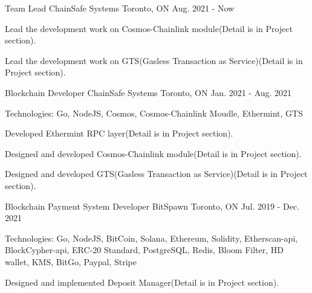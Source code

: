 \vspace{-2.0em}
\begin{cventries}
    \cventry
    {Team Lead}
    {ChainSafe Systems}
    {Toronto, ON}
    {Aug. 2021 - Now}
    {
      \begin{cvitems}
        \item {Lead the development work on Cosmos-Chainlink module(Detail is in Project section).}
        \item {Lead the development work on GTS(Gasless Transaction as Service)(Detail is in Project section).}
      \end{cvitems}
    }
    
    \cventry
    {Blockchain Developer}
    {ChainSafe Systems}
    {Toronto, ON}
    {Jan. 2021 - Aug. 2021}
    {
      \begin{cvitems}
        \item {Technologies: Go, NodeJS, Cosmos, Cosmos-Chainlink Moudle, Ethermint, GTS}
        \item {Developed Ethermint RPC layer(Detail is in Project section).}
        \item {Designed and developed Cosmos-Chainlink module(Detail is in Project section).}
        \item {Designed and developed GTS(Gasless Transaction as Service)(Detail is in Project section).}
      \end{cvitems}
    }
    
    \cventry
    {Blockchain Payment System Developer}
    {BitSpawn}
    {Toronto, ON}
    {Jul. 2019 - Dec. 2021}
    {
      \begin{cvitems}
        \item {Technologies: Go, NodeJS, BitCoin, Solana, Ethereum, Solidity, Etherscan-api, BlockCypher-api, ERC-20 Standard, PostgreSQL, Redis, Bloom Filter, HD wallet, KMS, BitGo, Paypal, Stripe}
        \item {Designed and implemented Deposit Manager(Detail is in Project section).}
      \end{cvitems}
    }


\end{cventries}
